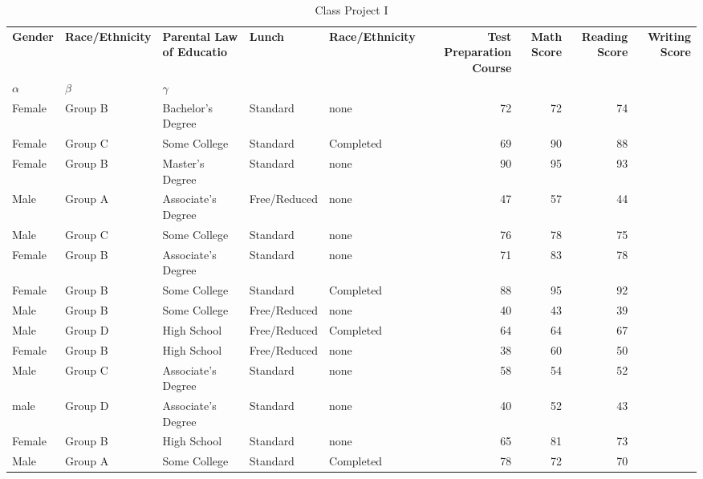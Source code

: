 \documentclass{article}
\begin{document}
		\begin{table}[h!]
		\centering
		\caption{Class Project I}
		\label{tab:tables}
\begin{tabular}{l|l|l|l|l|r|r|r|r}
			\hline
		\textbf{Gender}&\textbf{Race/Ethnicity}&\textbf{Parental Law of Educatio}&\textbf{Lunch}&\textbf{Race/Ethnicity}&\textbf{Test Preparation Course}&\textbf{Math Score}&\textbf{Reading Score}&\textbf{Writing Score}\\
		$ \alpha $&$ \beta $&$ \gamma $\\
		\hline
	Female & Group B & Bachelor's Degree & Standard & none & 72 & 72 & 74\\
	\hline
	Female & Group C & Some College & Standard & Completed & 69 & 90 & 88\\
	\hline
	Female & Group B & Master's Degree & Standard & none & 90 & 95 & 93\\
	\hline
	Male & Group A & Associate's Degree & Free/Reduced & none & 47 & 57 & 44\\
	\hline
	Male & Group C & Some College & Standard & none & 76 & 78 & 75\\
	\hline
	Female & Group B & Associate's Degree & Standard & none & 71 & 83 & 78\\
	\hline
	Female & Group B & Some College & Standard & Completed & 88 & 95 & 92\\
		\hline
	Male & Group B & Some College & Free/Reduced & none & 40 & 43 & 39\\
		\hline
	Male & Group D & High School & Free/Reduced & Completed & 64 & 64 & 67\\
		\hline
	Female & Group B & High School & Free/Reduced & none & 38 & 60 & 50\\
		\hline
	Male & Group C & Associate's Degree & Standard & none & 58 & 54 & 52\\
		\hline
	male & Group D & Associate's Degree & Standard & none & 40 & 52 & 43\\
	\hline
	Female & Group B & High School & Standard & none & 65 & 81 & 73\\
		\hline
	Male & Group A & Some College & Standard & Completed & 78 & 72 & 70\\
		\hline
		
		\end{tabular}
	\end{table}
\end{document}
